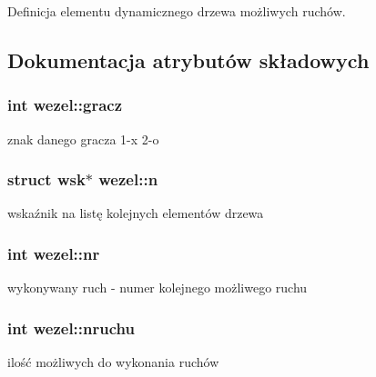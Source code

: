 Definicja elementu dynamicznego drzewa możliwych ruchów. 

\subsection{Dokumentacja atrybutów składowych}
\subsubsection[{\texorpdfstring{gracz}{gracz}}]{\setlength{\rightskip}{0pt plus 5cm}int wezel\+::gracz}\hypertarget{structwezel_ae0d7a5ffe5db5ae68d74ab8b796ef9d0}{}\label{structwezel_ae0d7a5ffe5db5ae68d74ab8b796ef9d0}


znak danego gracza 1-\/\textquotesingle{}x\textquotesingle{} 2-\/\textquotesingle{}o\textquotesingle{} 

\subsubsection[{\texorpdfstring{n}{n}}]{\setlength{\rightskip}{0pt plus 5cm}struct {\bf wsk}$\ast$ wezel\+::n}\hypertarget{structwezel_afa4e8d9b533246f9cf7d3ccdeefa2b3e}{}\label{structwezel_afa4e8d9b533246f9cf7d3ccdeefa2b3e}


wskaźnik na listę kolejnych elementów drzewa 

\subsubsection[{\texorpdfstring{nr}{nr}}]{\setlength{\rightskip}{0pt plus 5cm}int wezel\+::nr}\hypertarget{structwezel_aa2eeaaa4d77865a3a4d0e0fd4fbde30b}{}\label{structwezel_aa2eeaaa4d77865a3a4d0e0fd4fbde30b}


wykonywany ruch -\/ numer kolejnego możliwego ruchu 

\subsubsection[{\texorpdfstring{nruchu}{nruchu}}]{\setlength{\rightskip}{0pt plus 5cm}int wezel\+::nruchu}\hypertarget{structwezel_a810cda81b39057158de9c45373bb6959}{}\label{structwezel_a810cda81b39057158de9c45373bb6959}


ilość możliwych do wykonania ruchów 

